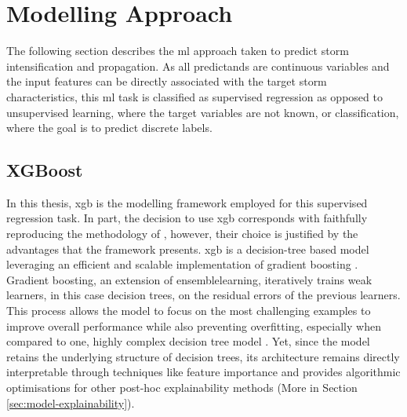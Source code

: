 \section{Modelling Approach}

The following section describes the \acrfull{ml} approach taken to predict storm intensification and propagation. As all predictands are continuous variables and the input features can be directly associated with the target storm characteristics, this \acrshort{ml} task is classified as supervised regression as opposed to unsupervised learning, where the target variables are not known, or classification, where the goal is to predict discrete labels.

\subsection{XGBoost}

In this thesis, \acrfull{xgb} is the modelling framework employed for this supervised regression task. In part, the decision to use \acrshort{xgb} corresponds with faithfully reproducing the methodology of \cite{Hunt2024}, however, their choice is justified by the advantages that the framework presents. \acrshort{xgb} is a decision-tree based model leveraging an efficient and scalable implementation of gradient boosting \citep{Chen2016}. Gradient boosting, an extension of \gls{ensemblelearning}, iteratively trains weak learners, in this case decision trees, on the residual errors of the previous learners. This process allows the model to focus on the most challenging examples to improve overall performance while also preventing overfitting, especially when compared to one, highly complex decision tree model \citep{Friedman2001}. Yet, since the model retains the underlying structure of decision trees, its architecture remains directly interpretable through techniques like feature importance and provides algorithmic optimisations for other post-hoc explainability methods \citep{Lundberg2019} (More in Section \ref{sec:model-explainability}).


